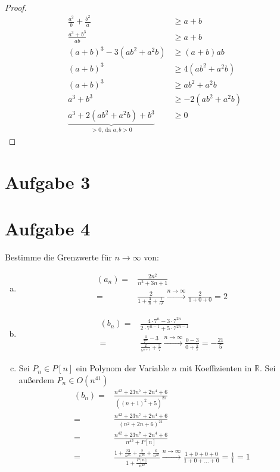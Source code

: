 \documentclass{scrreprt}
\newcommand{\RR}{\mathbb{R}}
\begin{document}
\begin{enumerate}[(a)]
\begin{align*}
				\end{align*}
				\begin{proof}
					\begin{align*}
						\frac{a^2}{b} + \frac{b^2}{a} &\geq a + b\\
						\frac{a^3 + b^3}{ab} &\geq a+b\\
						(a+b)^3 - 3(a b^2 + a^2 b) &\geq (a+b) ab\\
						(a+b)^3 & \geq 4(a b^2 + a^2 b)\\
						(a+b)^3 & \geq a b^2 + a^2 b\\
						a^3 + b^3 & \geq -2(a b^2 + a^2 b)\\
						\underbrace{a^3 + 2(a b^2 + a^2 b) + b^3}_\text{$> 0$, da $a, b > 0$} &\geq 0
					\end{align*}
				\end{proof}
		\end{enumerate}

	\section*{Aufgabe 3}

	\section*{Aufgabe 4}
		Bestimme die Grenzwerte für $n \to \infty$ von:
			\begin{enumerate}[(a)]
				\item
					\begin{align*}
						(a_n) =& \frac{2n^2}{n^2 + 3n + 1}\\
						= & \frac{2}{1 + \frac{3}{n} + \frac{1}{n^2}} \xrightarrow{n \to \infty} \frac{2}{1 + 0 + 0} = 2
					\end{align*}
				\item
					\begin{align*}
						(b_n) =& \frac{4 \cdot 7^n  - 3 \cdot 7^{2n}}{2 \cdot 7^{n-1} + 5 \cdot 7^{2n -1}}\\
						= & \frac{\frac{4}{7^n}  - 3 }{\frac{2}{7^{n+1}} + \frac{5}{7}} \xrightarrow{n \to \infty} \frac{0 - 3}{0 + \frac{5}{7}} = -\frac{21}{5}
					\end{align*}
				\item
					Sei $P_n \in P[n]$ ein Polynom der Variable $n$ mit Koeffizienten in $\RR$. Sei außerdem $P_n \in O(n^{41})$
					\begin{align*}
						(b_n) =& \frac{n^{42} + 23n^7 + 2n^4 + 6}{((n+1)^2 + 5)^{21}}\\
						=& \frac{n^{42} + 23n^7 + 2n^4 + 6}{(n^2 + 2n + 6)^{21}}\\
						=& \frac{n^{42} + 23n^7 + 2n^4 + 6}{n^{42} + P[n]}\\
						=& \frac{1 + \frac{23}{n^{35}} + \frac{2}{n^{38}} + \frac{6}{n^{42}}}{1 + \frac{P[n]}{n^{42}}}\xrightarrow{n \to \infty} \frac{1 + 0 + 0 + 0}{1 + 0 + \dots + 0} = \frac{1}{1} = 1
					\end{align*}
			\end{enumerate}
\end{document}

